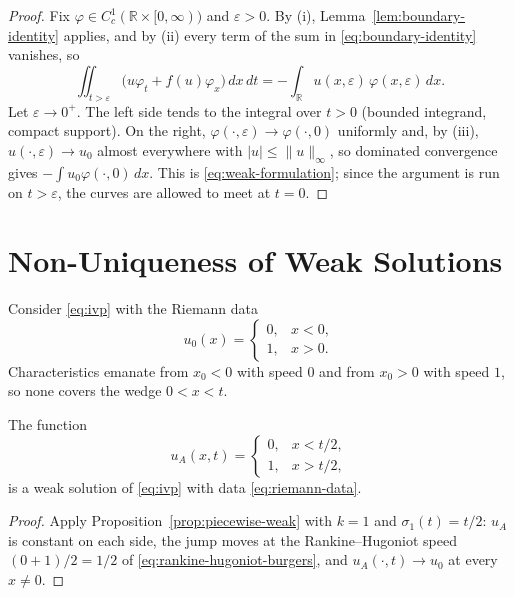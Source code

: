 \begin{proof}
Fix $\varphi\in C_c^1(\mathbb{R}\times[0,\infty))$ and $\varepsilon>0$. By (i),
Lemma~\ref{lem:boundary-identity} applies, and by (ii) every term of the sum in
\eqref{eq:boundary-identity} vanishes, so
\begin{equation*}
  \iint_{t>\varepsilon}\big(u\varphi_t+f(u)\varphi_x\big)\,dx\,dt
  = -\int_{\mathbb{R}} u(x,\varepsilon)\,\varphi(x,\varepsilon)\,dx .
\end{equation*}
Let $\varepsilon\to0^+$. The left side tends to the integral over
$t>0$ (bounded integrand, compact support). On the right,
$\varphi(\cdot,\varepsilon)\to\varphi(\cdot,0)$ uniformly and, by (iii),
$u(\cdot,\varepsilon)\to u_0$ almost everywhere with $|u|\le\|u\|_\infty$,
so dominated convergence gives $-\int u_0\varphi(\cdot,0)\,dx$. This is
\eqref{eq:weak-formulation}; since the argument is run on $t>\varepsilon$, the
curves are allowed to meet at $t=0$.
\end{proof}


\section{Non-Uniqueness of Weak Solutions}
\label{sec:nonuniqueness}

Consider \eqref{eq:ivp} with the Riemann data
\begin{equation}
  \label{eq:riemann-data}
  u_0(x) = \begin{cases} 0, & x < 0, \\ 1, & x > 0. \end{cases}
\end{equation}
Characteristics emanate from $x_0<0$ with speed $0$ and from $x_0>0$ with
speed $1$, so none covers the wedge $0<x<t$.

\begin{proposition}
\label{prop:shock-is-weak-solution}
The function
\begin{equation}
  \label{eq:shock-solution}
  u_A(x,t) = \begin{cases} 0, & x < t/2, \\ 1, & x > t/2, \end{cases}
\end{equation}
is a weak solution of \eqref{eq:ivp} with data \eqref{eq:riemann-data}.
\end{proposition}

\begin{proof}
Apply Proposition~\ref{prop:piecewise-weak} with $k=1$ and $\sigma_1(t)=t/2$:
$u_A$ is constant on each side, the jump moves at the Rankine--Hugoniot speed
$(0+1)/2=1/2$ of \eqref{eq:rankine-hugoniot-burgers}, and
$u_A(\cdot,t)\to u_0$ at every $x\ne0$.
\end{proof}

